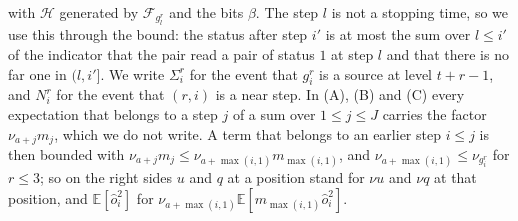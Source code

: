 \documentclass[11pt]{amsart}
\theoremstyle{definition}
\theoremstyle{remark}
\newcommand{\EE}{\mathbb{E}}
\newcommand{\cF}{\mathcal{F}}
\begin{document}
with $\mathcal H$ generated by $\cF_{g^r_l}$ and the bits $\beta$. The step $l$ is not a stopping
time, so we use this through the bound: the status after step $i'$ is at most the sum over
$l\le i'$ of the indicator that the pair read a pair of status $1$ at step $l$ and that there is
no far one in $(l,i']$. We write $\Sigma^r_i$ for the
event that $g^r_i$ is a source at level $t+r-1$, and $N^r_i$ for the event that $(r,i)$ is a near
step. In (A), (B) and (C) every expectation that belongs to a step $j$ of a sum over $1\le j\le J$
carries the factor $\nu_{a+j}m_j$, which we do not write. A term that belongs to an earlier step
$i\le j$ is then bounded with $\nu_{a+j}m_j\le\nu_{a+\max(i,1)}m_{\max(i,1)}$, and
$\nu_{a+\max(i,1)}\le\nu_{g^r_i}$ for $r\le3$; so on the right sides $u$ and $q$ at a position
stand for $\nu u$ and $\nu q$ at that position, and $\EE[\hat o^2_i]$ for
$\nu_{a+\max(i,1)}\EE[m_{\max(i,1)}\hat o^2_i]$.
\end{document}
